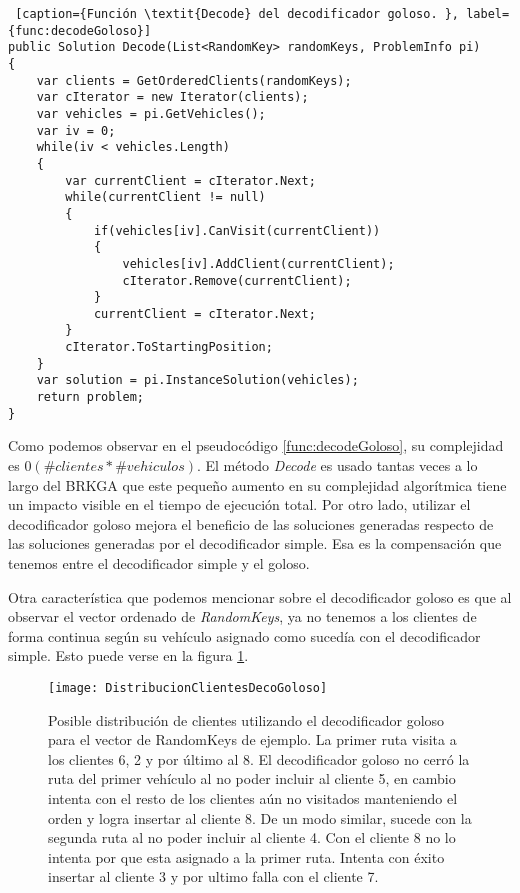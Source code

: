 \bigskip

\begin{minipage}{\linewidth}
\begin{lstlisting} [caption={Función \textit{Decode} del decodificador goloso. }, label={func:decodeGoloso}]
public Solution Decode(List<RandomKey> randomKeys, ProblemInfo pi)
{
	var clients = GetOrderedClients(randomKeys);
	var cIterator = new Iterator(clients);
	var vehicles = pi.GetVehicles();	
	var iv = 0;
	while(iv < vehicles.Length)
	{
		var currentClient = cIterator.Next;
		while(currentClient != null)
		{
			if(vehicles[iv].CanVisit(currentClient))
			{
				vehicles[iv].AddClient(currentClient);
				cIterator.Remove(currentClient);
			}
			currentClient = cIterator.Next;
		}
		cIterator.ToStartingPosition;
	}
	var solution = pi.InstanceSolution(vehicles);
	return problem;
}
\end{lstlisting}
\end{minipage}

\bigskip

Como podemos observar en el pseudocódigo \ref{func:decodeGoloso}, su complejidad es $0(\#clientes * \#vehiculos)$. El método \textit{Decode} es usado tantas veces a lo largo del BRKGA que este pequeño aumento en su complejidad algorítmica tiene un impacto visible en el tiempo de ejecución total. Por otro lado, utilizar el decodificador goloso mejora el beneficio de las soluciones generadas respecto de las soluciones generadas por el decodificador simple. Esa es la compensación que tenemos entre el decodificador simple y el goloso.

\bigskip

Otra característica que podemos mencionar sobre el decodificador goloso es que al observar el vector ordenado de \textit{RandomKeys}, ya no tenemos a los clientes de forma continua según su vehículo asignado como sucedía con el decodificador simple. Esto puede verse en la figura \ref{fig:DistribucionClientesDecoGoloso}.

\begin{figure}[h]
	\caption{Posible distribución de clientes utilizando el decodificador goloso para el vector de RandomKeys de ejemplo. La primer ruta visita a los clientes 6, 2 y por último al 8. El decodificador goloso no cerró la ruta del primer vehículo al no poder incluir al cliente 5, en cambio intenta con el resto de los clientes aún no visitados manteniendo el orden y logra insertar al cliente 8. De un modo similar, sucede con la segunda ruta al no poder incluir al cliente 4. Con el cliente 8 no lo intenta por que esta asignado a la primer ruta. Intenta con éxito insertar al cliente 3 y por ultimo falla con el cliente 7. }
	\centering
	\texttt{[image: DistribucionClientesDecoGoloso]}
	\label{fig:DistribucionClientesDecoGoloso}
\end{figure}

